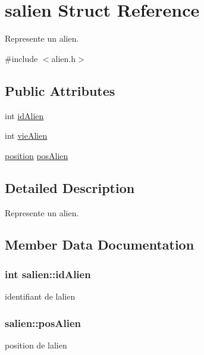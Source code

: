 \hypertarget{structsalien}{}\section{salien Struct Reference}
\label{structsalien}


Represente un alien.  




{\ttfamily \#include $<$alien.\+h$>$}

\subsection*{Public Attributes}
\begin{DoxyCompactItemize}
\item 
int \hyperlink{structsalien_a99db4fcee609d9f032bc863eebab3b9e}{id\+Alien}
\item 
int \hyperlink{structsalien_af36f8e1a34c1fc9abfbb18314091beb2}{vie\+Alien}
\item 
\hyperlink{structsposition}{position} \hyperlink{structsalien_a22c446dfdc028d5cb6a25d1653a804ec}{pos\+Alien}
\end{DoxyCompactItemize}


\subsection{Detailed Description}
Represente un alien. 

\subsection{Member Data Documentation}
\subsubsection[{\texorpdfstring{id\+Alien}{idAlien}}]{\setlength{\rightskip}{0pt plus 5cm}int salien\+::id\+Alien}\hypertarget{structsalien_a99db4fcee609d9f032bc863eebab3b9e}{}\label{structsalien_a99db4fcee609d9f032bc863eebab3b9e}
identifiant de l\textquotesingle{}alien 
\subsubsection[{\texorpdfstring{pos\+Alien}{posAlien}}]{ salien\+::pos\+Alien}\hypertarget{structsalien_a22c446dfdc028d5cb6a25d1653a804ec}{}\label{structsalien_a22c446dfdc028d5cb6a25d1653a804ec}
position de l\textquotesingle{}alien 

